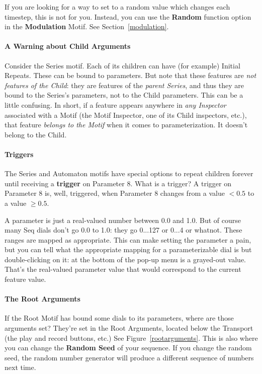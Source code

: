 \documentclass[twoside,10pt]{article}
\begin{document}
If you are looking for a way to set to a random value which changes each timestep, this is not for you.  Instead, you can use the {\bf Random} function option in the {\bf Modulation} Motif.  See Section~\ref{modulation}.

\paragraph{A Warning about Child Arguments}

Consider the Series motif. Each of its children can have (for example) Initial Repeats.  These can be bound to parameters.  But note that these features are {\it not features of the Child}: they are features of the {\it parent Series}, and thus they are bound to the Series's parameters, not to the Child parameters.  This can be a little confusing.  In short, if a feature appears anywhere in {\it any Inspector} associated with a Motif (the Motif Inspector, one of its Child inspectors, etc.), that feature {\it belongs to the Motif} when it comes to parameterization.  It doesn't belong to the Child.

\paragraph{Triggers} The Series and Automaton motifs have special options to repeat children forever until receiving a {\bf trigger} on Parameter 8.  What is a trigger?  A trigger on Parameter 8 is, well, triggered, when Parameter 8 changes from a value \(< 0.5\) to a value \(\geq 0.5\). 


A parameter is just a real-valued number between 0.0 and 1.0.  But of course many Seq dials don't go 0.0 to 1.0: they go 0...127 or 0...4 or whatnot.  These ranges are mapped  as appropriate.  This can make setting the parameter a pain, but you can tell what the appropriate mapping for a parameterizable dial is but double-clicking on it: at the bottom of the pop-up menu is a grayed-out value. That's the real-valued parameter value that would correspond to the current feature value.    


\paragraph{The Root Arguments}  If the Root Motif has bound some dials to its parameters, where are those arguments set?  They're set in the Root Arguments, located below the Transport (the play and record buttons, etc.)  See Figure~\ref{rootarguments}.  This is also where you can change the {\bf Random Seed} of your sequence.  If you change the random seed, the random number generator will produce a different sequence of numbers next time.
\end{document}
